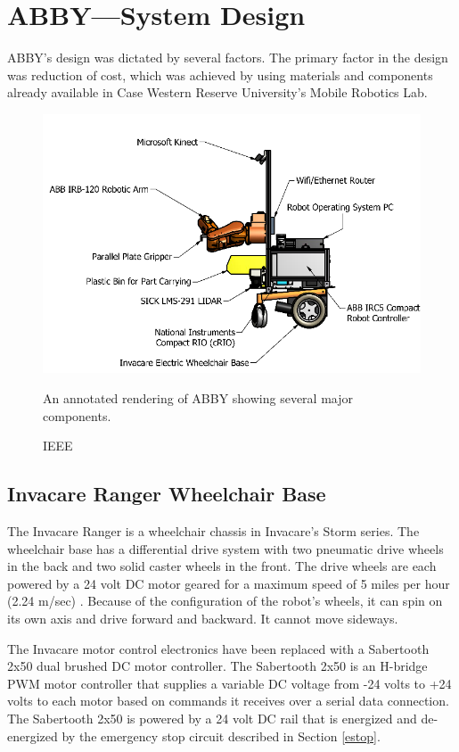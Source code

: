 \documentclass[]{cwru} %
\begin{document}
\chapter{ABBY---System Design}

ABBY's design was dictated by several factors. The primary factor in the
design was reduction of cost, which was achieved by using materials and
components already available in Case Western Reserve University's Mobile
Robotics Lab.

\begin{figure}[ht]
\centering
\includegraphics[width=6.0in]{abby-diagram}
\caption{An annotated rendering of ABBY showing several major components.}
\caption*{ IEEE \cite{venator_case}}
\label{abby-diagram}
\end{figure}

\section{Invacare Ranger Wheelchair Base}

The Invacare Ranger is a wheelchair chassis in Invacare's Storm series.
The wheelchair base has a differential drive system with two pneumatic
drive wheels in the back and two solid caster wheels in the front. The
drive wheels are each powered by a 24 volt DC motor geared for a maximum
speed of 5 miles per hour (2.24 m/sec) \cite{venator_case}. Because of the
configuration of the robot's wheels, it can spin on its own axis and
drive forward and backward. It cannot move sideways.

The Invacare motor control electronics have been replaced with a
Sabertooth 2x50 dual brushed DC motor controller. The Sabertooth 2x50 is
an H-bridge PWM motor controller that supplies a variable DC voltage
from -24 volts to +24 volts to each motor based on commands it receives
over a serial data connection. The Sabertooth 2x50 is powered by a 24
volt DC rail that is energized and de-energized by the emergency stop
circuit described in Section \ref{estop}.
\end{document}

